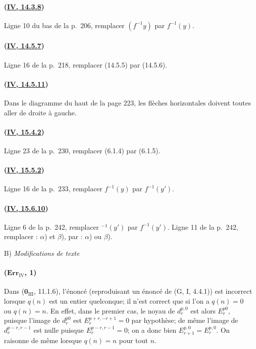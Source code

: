 \paragraph{({\texorpdfstring{\protect\hyperref[canon-index.ega4.c04.prop.14-3-8]{IV, 14.3.8}}{IV, 14.3.8}})}
Ligne 10 du bas de la p.~206, remplacer $(f^{-1}y)$ par $f^{-1}(y)$.

\paragraph{({\texorpdfstring{\protect\hyperref[canon-index.ega4.c04.rem.14-5-7]{IV, 14.5.7}}{IV, 14.5.7}})}
Ligne 16 de la p.~218, remplacer (14.5.5) par (14.5.6).

\paragraph{({\texorpdfstring{\protect\hyperref[canon-index.ega4.c04.cor.14-5-11]{IV, 14.5.11}}{IV, 14.5.11}})}
Dans le diagramme du haut de la page 223, les flèches horizontales
doivent toutes aller de droite à gauche.

\paragraph{({\texorpdfstring{\protect\hyperref[canon-index.ega4.c04.prop.15-4-2]{IV, 15.4.2}}{IV, 15.4.2}})}
Ligne 23 de la p.~230, remplacer (6.1.4) par (6.1.5).

\paragraph{({\texorpdfstring{\protect\hyperref[canon-index.ega4.c04.cor.15-5-2]{IV, 15.5.2}}{IV, 15.5.2}})}
Ligne 16 de la p.~233, remplacer $f^{-1}(y)$ par $f^{-1}(y')$.

\paragraph{({\texorpdfstring{\protect\hyperref[canon-index.ega4.c04.item.15-6-10]{IV, 15.6.10}}{IV, 15.6.10}})}
Ligne 6 de la p.~242, remplacer ${}^{-1}(y')$ par $f^{-1}(y')$.
Ligne 11 de la p.~242, remplacer : $\alpha$) et $\beta$), par :
$\alpha$) ou $\beta$).

\begin{center}
B) \emph{Modifications de texte}
\end{center}

\paragraph{($\mathbf{Err}_{\mathrm{IV}}$, 1)}
Dans ($\mathbf{0}_{\mathrm{III}}$, 11.1.6), l'énoncé (reproduisant un énoncé de
(G, I, 4.4.1)) est incorrect lorsque $q(n)$ est un entier quelconque;
il n'est correct que si l'on a $q(n)=0$ ou $q(n)=n$. En effet, dans le
premier cas, le noyau de $d_r^{p,0}$ est alors $E_r^{p0}$, puisque
l'image de $d_r^{p0}$ est $E_r^{p+r,-r+1}=0$ par hypothèse; de même
l'image de $d_r^{p-r,r-1}$ est nulle puisque
$E_r^{p-r,r-1}=0$; on a donc bien $E_{r+1}^{p,0}=E_r^{p,0}$. On
raisonne de même lorsque $q(n)=n$ pour tout $n$.


